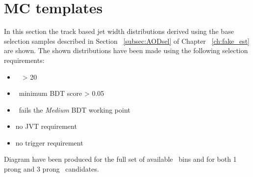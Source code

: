 \section{MC templates}
\label{app:AODtemplates}
In this section the track based jet width distributions derived using the base selection samples described in Section ~\ref{subsec:AODsel} of Chapter ~\ref{ch:fake_est} are shown. The shown distributions have been made using the following selection requirements:
\begin{itemize}
\item[] \htau\ \pt\ > 20 \gev
\item[] \htau\ minimum \ac{BDT} score > 0.05
\item[] \htau\ fails the \textit{Medium} \ac{BDT} working point
\item[] no \ac{JVT} requirement 
\item[] no trigger requirement
\end{itemize}
Diagram have been produced for the full set of available \pt\ bins and for both 1 prong and 3 prong \ftau\ candidates. 

\newpage
